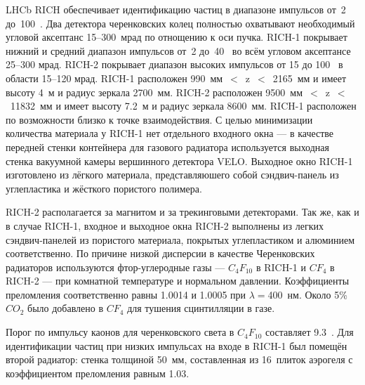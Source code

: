 LHCb RICH обеспечивает идентификацию частиц в диапазоне импульсов от~2 до~100~\GeVoverC{}. Два детектора черенковских колец полностью охватывают необходимый угловой аксептанс 15--300~мрад по отнощению к оси пучка. \mbox{RICH-1} покрывает нижний и средний диапазон импульсов от~2 до~40~\GeVoverC{} во всём угловом аксептансе 25--300 мрад. \mbox{RICH-2} покрывает диапазон высоких импульсов от 15 до 100~\GeVoverC{} в области 15--120 мрад.
\mbox{RICH-1} расположен 990~мм~$<$~z~$<$~2165~мм и имеет высоту 4~м и радиус зеркала 2700~мм.
\mbox{RICH-2} расположен 9500~мм~$<$~z~$<$~11832~мм и имеет высоту 7.2~м и радиус зеркала 8600~мм.
\mbox{RICH-1} расположен по возможности близко к точке взаимодействия. С целью минимизации количества материала у \mbox{RICH-1} нет отдельного входного окна --- в качестве передней стенки контейнера для газового радиатора используется выходная стенка вакуумной камеры вершинного детектора VELO. Выходное окно \mbox{RICH-1} изготовлено из лёгкого материала, представляюшего собой сэндвич-панель из углепластика и жёсткого пористого полимера.


\mbox{RICH-2} располагается за магнитом и за трекинговыми детекторами.
Так же, как и в случае \mbox{RICH-1}, входное и выходное окна \mbox{RICH-2} выполнены из легких сэндвич-панелей из пористого материала, покрытых углепластиком и алюминием соответственно. По причине низкой дисперсии в качестве Черенковских радиаторов используются фтор-углеродные газы --- $C_{4}F_{10}$ в \mbox{RICH-1} и $CF_{4}$ в \mbox{RICH-2} --- при комнатной температуре и нормальном давлении. Коэффициенты преломления соответственно равны 1.0014 и 1.0005 при $\lambda = $400~нм. Около 5\% $CO_{2}$ было добавлено в $CF_{4}$ для тушения сцинтилляции в газе.

Порог по импульсу каонов для черенковского света в $C_{4}F_{10}$ составляет 9.3~\GeVoverC{}. Для идентификации частиц при низких импульсах на входе в \mbox{RICH-1} был помещён второй радиатор: стенка толщиной 50~мм, составленная из 16~плиток аэрогеля с коэффициентом преломления равным 1.03.

